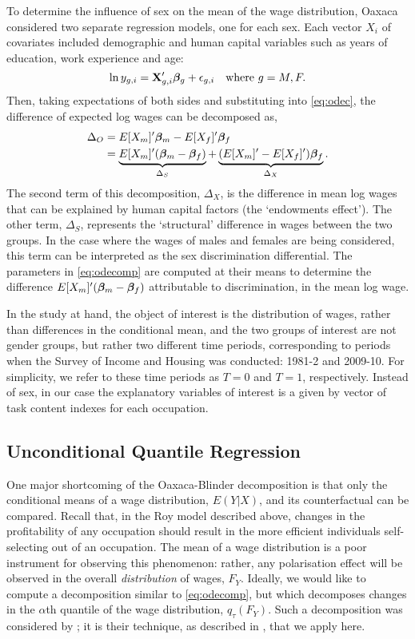 To determine the influence of sex on the mean of the wage distribution, Oaxaca considered two separate regression models, one for each sex. Each vector $X_i$ of covariates included demographic and human capital variables such as years of education, work experience and age:
$$  \ln y_{g,i} = \mathbf{X}_{g,i}'\boldsymbol{\beta}_g + \epsilon_{g,i} \quad \text{where}\ g=M,F. $$
Then, taking expectations of both sides and substituting into \eqref{eq:odec}, the difference of expected log wages can be decomposed as,
\begin{align}
  \Delta_O &= E[X_m]'\boldsymbol{\beta}_m -  E[X_f]'\boldsymbol{\beta}_f \notag \\
  &= \underbrace{E[X_m]'(\boldsymbol{\beta}_m - \boldsymbol{\beta}_f)}_{\Delta_S} + \underbrace{(E[X_m]'-E[X_f]')\boldsymbol{\beta}_f}_{\Delta_X}. \label{eq:odecomp}
\end{align}
The second term of this decomposition, $\Delta_X$, is the difference in mean log wages that can be explained by human capital factors (the `endowments effect'). The other term, $\Delta_S$, represents the `structural' difference in wages between the two groups. In the case where the wages of males and females are being considered, this term can be interpreted as the sex discrimination differential. The parameters in \eqref{eq:odecomp} are computed at their means to determine the difference $E[X_m]'(\boldsymbol{\beta}_m - \boldsymbol{\beta}_f)$ attributable to discrimination, in the mean log wage.

In the study at hand, the object of interest is the distribution of wages, rather than differences in the conditional mean, and the two groups of interest are not gender groups, but rather two different time periods, corresponding to periods when the Survey of Income and Housing was conducted: 1981-2 and 2009-10. For simplicity, we refer to these time periods as $T=0$ and $T=1$, respectively. Instead of sex, in our case the explanatory variables of interest is a given by vector of task content indexes for each occupation.  

\subsection{Unconditional Quantile Regression}

One major shortcoming of the Oaxaca-Blinder decomposition is that only the conditional means of a wage distribution, $E(Y|X)$, and its counterfactual can be compared. Recall that, in the Roy model described above, changes in the profitability of any occupation should result in the more efficient individuals self-selecting out of an occupation. The mean of a wage distribution is a poor instrument for observing this phenomenon: rather, any polarisation effect will be observed in the overall {\em distribution} of wages, $F_Y$. Ideally, we would like to compute a decomposition similar to \eqref{eq:odecomp}, but which decomposes changes in the $\alpha$th quantile of the wage distribution, $q_\tau(F_Y)$. Such a decomposition was considered by \citet{Firpo2011}; it is their technique, as described in \citet{Firpo2009}, that we apply here.

